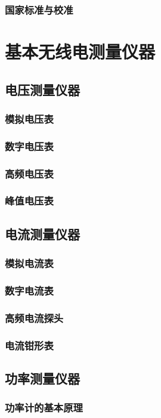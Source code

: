 \documentclass[12pt,UTF8]{ctexbook}
\begin{document}
\section{国家标准与校准}

\part{基本无线电测量仪器}

\chapter{电压测量仪器}
\section{模拟电压表}
\section{数字电压表}
\section{高频电压表}
\section{峰值电压表}

\chapter{电流测量仪器}
\section{模拟电流表}
\section{数字电流表}
\section{高频电流探头}
\section{电流钳形表}

\chapter{功率测量仪器}
\section{功率计的基本原理}
\end{document}
